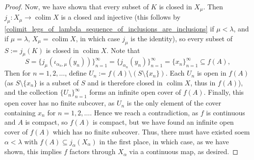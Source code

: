 \documentclass{amsart}
\theoremstyle{plain}
\theoremstyle{definition}
\newcommand{\sseq}{\subseteq}
\newcommand{\0}{\mathbf{0}}
\renewcommand{\(}{\left(}
\renewcommand{\)}{\right)}
\DeclareMathOperator*{\colim}{colim}
\begin{document}
\begin{proof}
  Now, we have shown that every subset of $K$ is closed in $X_{\mu}$. Then $j_\mu:X_\mu\to\colim X$ is a closed and injective (this follows by \autoref{colimit_legs_of_lambda_sequence_of_inclusions_are_inclusions} if $\mu<\lambda$, and if $\mu=\lambda$, $X_\mu=\colim X$, in which case $j_\mu$ is the identity), so every subset of $S:=j_\mu(K)$ is closed in $\colim X$. Note that
  \[S=\{j_\mu(\iota_{\alpha_n,\mu}(y_n))\}_{n=1}^\infty=\{j_{\alpha_n}(y_n)\}_{n=1}^\infty=\{x_n\}_{n=1}^\infty\sseq f(A),\]
  Then for $n=1,2,\ldots$, define $U_n:=f(A)\setminus (S\setminus\{x_n\})$. Each $U_n$ is open in $f(A)$ (as $S\setminus\{x_n\}$ is a subset of $S$ and is therefore closed in $\colim X$, thus in $f(A)$), and the collection $\{U_n\}_{n=1}^\infty$ forms an infinite open cover of $f(A)$. Finally, this open cover has no finite subcover, as $U_n$ is the only element of the cover containing $x_n$ for $n=1,2,\ldots$. Hence we reach a contradiction, as $f$ is continuous and $A$ is compact, so $f(A)$ is compact, but we have found an infinite open cover of $f(A)$ which has no finite subcover. Thus, there must have existed soem $\alpha<\lambda$ with $f(A)\sseq j_\alpha(X_\alpha)$ in the first place, in which case, as we have shown, this implies $f$ factors through $X_\alpha$ via a continuous map, as desired.
\end{proof}
\end{document}
